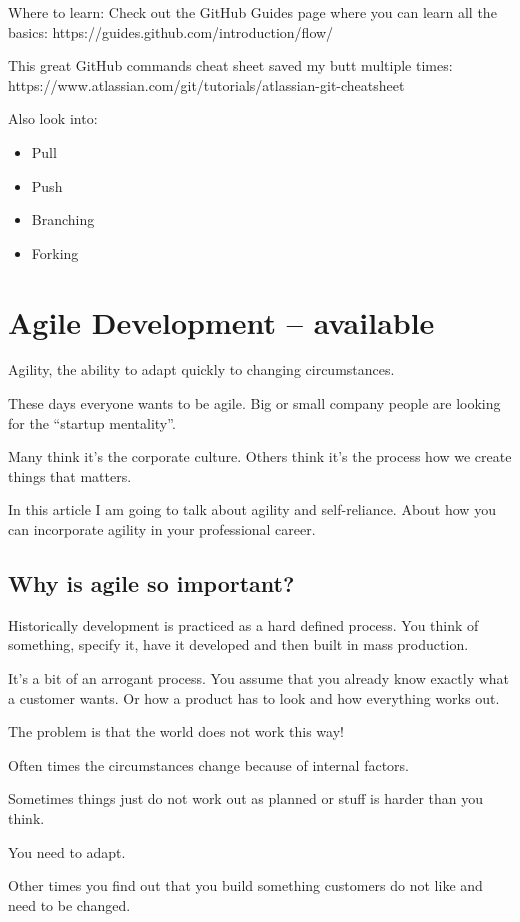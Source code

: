 \documentclass[12pt, numbers=noenddot]{scrreprt} %
\begin{document}
Where to learn:
Check out the GitHub Guides page where you can learn all the basics: https://guides.github.com/introduction/flow/

This great GitHub commands cheat sheet saved my butt multiple times: https://www.atlassian.com/git/tutorials/atlassian-git-cheatsheet

Also look into:
\begin{itemize}
\item Pull
\item Push
\item Branching
\item Forking
\end{itemize}


\chapter{Agile Development  -- available}
Agility, the ability to adapt quickly to changing circumstances.

These days everyone wants to be agile. Big or small company people are looking for the “startup mentality”.

Many think it’s the corporate culture. Others think it’s the process how we create things that matters.

In this article I am going to talk about agility and self-reliance. About how you can incorporate agility in your professional career.

\section{Why is agile so important?}
Historically development is practiced as a hard defined process. You think of something, specify it, have it developed and then built in mass production.

It’s a bit of an arrogant process. You assume that you already know exactly what a customer wants. Or how a product has to look and how everything works out.

The problem is that the world does not work this way!

Often times the circumstances change because of internal factors.

Sometimes things just do not work out as planned or stuff is harder than you think.

You need to adapt.

Other times you find out that you build something customers do not like and need to be changed.
\end{document}
